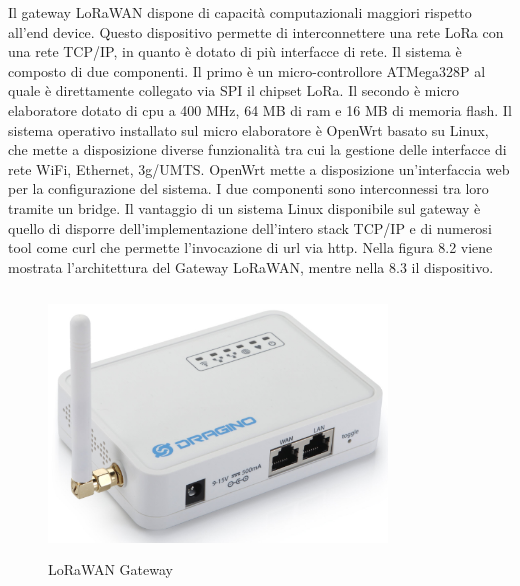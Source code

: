 \documentclass[12pt,a4paper,openright,twoside]{report}
\begin{document}
Il gateway LoRaWAN dispone di capacit\`a computazionali maggiori rispetto all'end device. 
Questo dispositivo permette di interconnettere una rete LoRa con una rete TCP/IP, in quanto \`e dotato di pi\`u interfacce di rete. Il sistema \`e composto di due componenti. Il primo \`e un micro-controllore ATMega328P al quale \`e direttamente collegato via SPI il chipset LoRa. Il secondo \`e micro elaboratore dotato di cpu a 400 MHz, 64 MB di ram e 16 MB di memoria flash. Il sistema operativo installato sul micro elaboratore \`e OpenWrt basato su Linux, che mette a disposizione diverse funzionalit\`a tra cui la gestione delle interfacce di rete WiFi, Ethernet, 3g/UMTS. OpenWrt mette a disposizione un'interfaccia web per la configurazione del sistema. I due componenti sono interconnessi tra loro tramite un bridge. Il vantaggio di un sistema Linux disponibile sul gateway \`e quello di disporre dell'implementazione dell'intero stack TCP/IP e di numerosi tool come curl che permette l'invocazione di url via http. Nella figura 8.2 viene mostrata l'architettura del Gateway LoRaWAN, mentre nella 8.3 il dispositivo.  


\begin{figure}[h]                      
\begin{center} 
\includegraphics[width=90mm,height=70mm]{LoRa_dragino_GW.png}
\caption[LoRaWAN Gateway]{LoRaWAN Gateway}
\end{center}
\end{figure}
\end{document}
